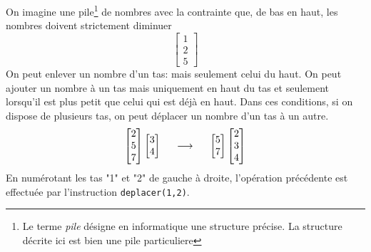 On imagine une pile\footnote{Le terme \emph{pile} désigne en informatique une structure précise. La structure décrite ici est bien une pile particuliere} de nombres avec la contrainte que, de bas en haut, les nombres doivent strictement diminuer 
\begin{displaymath}
\begin{bmatrix}
1 \\ 2  \\ 5                                                                                                          
\end{bmatrix} 
\end{displaymath}
On peut enlever un nombre d'un tas: mais seulement celui du haut. On peut ajouter un nombre à un tas mais uniquement en haut du tas et seulement lorsqu'il est plus petit que celui qui est déjà en haut. Dans ces conditions, si on dispose de plusieurs tas, on peut déplacer un nombre d'un tas à un autre.
\begin{displaymath}
\begin{bmatrix}
2 \\ 5  \\ 7                                                                                                          
\end{bmatrix} 
\begin{bmatrix}
 3  \\ 4                                                                                                          
\end{bmatrix} 
\hspace{0.5cm} \longrightarrow \hspace{0.5cm}
\begin{bmatrix}
 5  \\ 7                                                                                                          
\end{bmatrix} 
\begin{bmatrix}
2 \\ 3  \\ 4                                                                                                          
\end{bmatrix} 
\end{displaymath}
En numérotant les tas "1" et "2" de gauche à droite, l'opération précédente est effectuée par l'instruction \verb|deplacer(1,2)|.
